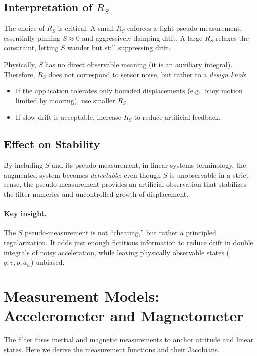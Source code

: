 \documentclass[10pt]{extarticle}
\begin{document}
\subsection{Interpretation of $R_S$}
The choice of $R_S$ is critical. A small $R_S$ enforces a tight pseudo-measurement,
essentially pinning $S\approx 0$ and aggressively damping drift. A large $R_S$ relaxes
the constraint, letting $S$ wander but still suppressing drift.

Physically, $S$ has no direct observable meaning (it is an auxiliary integral).
Therefore, $R_S$ does not correspond to sensor noise, but rather to a 
\emph{design knob}:
\begin{itemize}
\item If the application tolerates only bounded displacements (e.g.\ buoy motion limited
by mooring), use smaller $R_S$.
\item If slow drift is acceptable, increase $R_S$ to reduce artificial feedback.
\end{itemize}

\subsection{Effect on Stability}
By including $S$ and its pseudo-measurement, in linear systems terminology, the augmented
system becomes \emph{detectable}: even though $S$ is unobservable in a strict sense, the 
pseudo-measurement provides an artificial observation that stabilizes the filter numerics and
uncontrolled growth of displacement.

\paragraph{Key insight.} 
The $S$ pseudo-measurement is not “cheating,” but rather a principled
regularization. It adds just enough fictitious information to reduce drift in double integrals of noisy acceleration, 
while leaving physically observable states ($q,v,p,a_w$) unbiased.

\section{Measurement Models: Accelerometer and Magnetometer}
\label{sec:meas-models}

The filter fuses inertial and magnetic measurements to anchor attitude and
linear states. Here we derive the measurement functions and their Jacobians.
\end{document}
